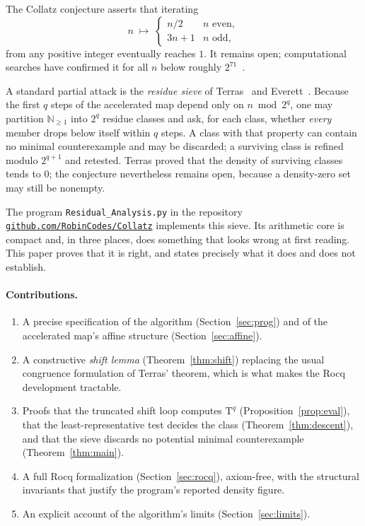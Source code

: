 \documentclass[11pt,a4paper]{article}
\theoremstyle{plain}
\theoremstyle{definition}
\newcommand{\Np}{\mathbb{N}_{\geq 1}}
\newcommand{\Tmap}{\mathrm{T}}
\begin{document}
The Collatz conjecture asserts that iterating
\[
  n \;\longmapsto\;
  \begin{cases}
    n/2 & n \text{ even},\\
    3n+1 & n \text{ odd},
  \end{cases}
\]
from any positive integer eventually reaches $1$. It remains open; computational
searches have confirmed it for all $n$ below roughly $2^{71}$~\cite{barina}.

A standard partial attack is the \emph{residue sieve} of Terras~\cite{terras}
and Everett~\cite{everett}. Because the first $q$ steps of the accelerated map
depend only on $n \bmod 2^{q}$, one may partition $\Np$ into $2^{q}$ residue
classes and ask, for each class, whether \emph{every} member drops below
itself within $q$ steps. A class with that property can contain no minimal
counterexample and may be discarded; a surviving class is refined modulo
$2^{q+1}$ and retested. Terras proved that the density of surviving classes
tends to $0$; the conjecture nevertheless remains open, because a density-zero
set may still be nonempty.

The program \texttt{Residual\_Analysis.py} in the repository
\href{https://github.com/RobinCodes/Collatz}{\texttt{github.com/RobinCodes/Collatz}}
implements this sieve. Its arithmetic core is compact and, in three places,
does something that looks wrong at first reading. This paper proves that it is
right, and states precisely what it does and does not establish.

\paragraph{Contributions.}
\begin{enumerate}\itemsep2pt
\item A precise specification of the algorithm (Section~\ref{sec:prog}) and of
      the accelerated map's affine structure (Section~\ref{sec:affine}).
\item A constructive \emph{shift lemma} (Theorem~\ref{thm:shift}) replacing the
      usual congruence formulation of Terras' theorem, which is what makes the
      Rocq development tractable.
\item Proofs that the truncated shift loop computes $\Tmap^{q}$
      (Proposition~\ref{prop:eval}), that the least-representative test decides
      the class (Theorem~\ref{thm:descent}), and that the sieve discards no
      potential minimal counterexample (Theorem~\ref{thm:main}).
\item A full Rocq formalization (Section~\ref{sec:rocq}), axiom-free, with the
      structural invariants that justify the program's reported density figure.
\item An explicit account of the algorithm's limits (Section~\ref{sec:limits}).
\end{enumerate}
\end{document}

